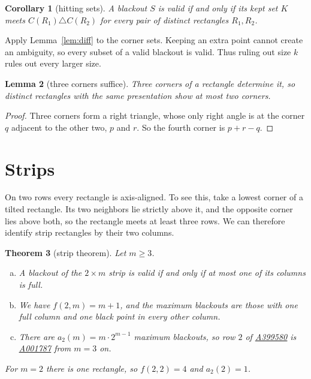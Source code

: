 \documentclass[12pt]{article}
\theoremstyle{plain}
\newtheorem{theorem}{Theorem}
\newtheorem{lemma}[theorem]{Lemma}
\newtheorem{corollary}[theorem]{Corollary}
\theoremstyle{definition}
\theoremstyle{remark}
\newcommand{\seqnum}[1]{\href{https://oeis.org/#1}{\rm \underline{#1}}}
\begin{document}
\begin{corollary}[hitting sets]\label{cor:hitting}
A blackout $S$ is valid if and only if its kept set $K$ meets
$C(R_1)\triangle C(R_2)$ for every pair of distinct rectangles $R_1,R_2$.
\end{corollary}

Apply Lemma~\ref{lem:diff} to the corner sets. Keeping an extra point cannot
create an ambiguity, so every subset of a valid blackout is valid.
Thus ruling out size $k$ rules out every larger size.

\begin{lemma}[three corners suffice]\label{lem:threecorners}
Three corners of a rectangle determine it, so distinct rectangles with the same
presentation show at most two corners.
\end{lemma}

\begin{proof}
Three corners form a right triangle, whose only right angle is at the corner $q$ adjacent
to the other two, $p$ and $r$. So the fourth corner is $p+r-q$.
\end{proof}
\section{Strips}\label{sec:strip}

On two rows every rectangle is axis-aligned. To see this, take a lowest
corner of a tilted rectangle. Its two neighbors lie strictly above it, and
the opposite corner lies above both, so the rectangle meets at least three
rows. We can therefore identify strip rectangles by their two columns.

\begin{theorem}[strip theorem]\label{thm:strip}
Let $m\ge3$.
\begin{enumerate}[(a)]
\item A blackout of the $2\times m$ strip is valid if and only if at most one of its columns is full.
\item We have $f(2,m)=m+1$, and the maximum blackouts are those with one full column
and one black point in every other column.
\item There are $a_2(m)=m\cdot2^{m-1}$ maximum blackouts, so row $2$ of
\seqnum{A399580} is \seqnum{A001787} from $m=3$ on.
\end{enumerate}
For $m=2$ there is one rectangle, so $f(2,2)=4$ and $a_2(2)=1$.
\end{theorem}
\end{document}
